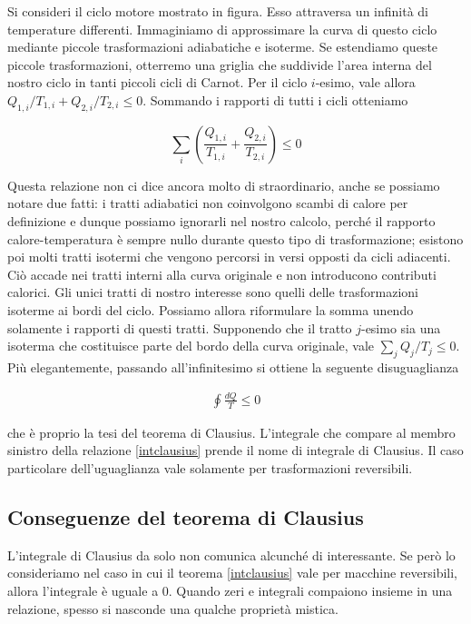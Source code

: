 Si consideri il ciclo motore mostrato in figura. Esso attraversa
un infinità di temperature differenti. Immaginiamo di approssimare
la curva di questo ciclo mediante piccole trasformazioni adiabatiche
e isoterme. Se estendiamo queste piccole trasformazioni, otterremo
una griglia che suddivide l'area interna del nostro ciclo in tanti
piccoli cicli di Carnot. Per il ciclo $i$-esimo, vale allora
$Q_{1,i}/T_{1,i} + Q_{2,i}/T_{2,i} \leq 0$. Sommando i rapporti di
tutti i cicli otteniamo

\[ \sum_i \left(\frac{Q_{1,i}}{T_{1,i}} + \frac{Q_{2,i}}{T_{2,i}}\right) \leq 0 \]

\noindent Questa relazione non ci dice ancora molto di straordinario,
anche se possiamo notare due fatti: i tratti adiabatici non coinvolgono
scambi di calore per definizione e dunque possiamo ignorarli nel
nostro calcolo, perché il rapporto calore-temperatura è sempre nullo
durante questo tipo di trasformazione; esistono poi molti tratti
isotermi che vengono percorsi in versi opposti da cicli adiacenti.
Ciò accade nei tratti interni alla curva originale e non introducono
contributi calorici. Gli unici tratti di nostro interesse sono
quelli delle trasformazioni isoterme ai bordi del ciclo. Possiamo
allora riformulare la somma unendo solamente i rapporti di questi
tratti. Supponendo che il tratto $j$-esimo sia una isoterma che
costituisce parte del bordo della curva originale, vale
$\sum_j Q_j/T_j \leq 0$. Più elegantemente, passando all'infinitesimo
si ottiene la seguente disuguaglianza

\begin{align}
    \oint \frac{dQ}{T} \leq 0\label{intclausius}
\end{align}

\noindent che è proprio la tesi del teorema di Clausius. L'integrale
che compare al membro sinistro della relazione \ref{intclausius}
prende il nome di integrale di Clausius. Il caso particolare
dell'uguaglianza vale solamente per trasformazioni reversibili.

\subsection{Conseguenze del teorema di Clausius}
L'integrale di Clausius da solo non comunica alcunché di interessante.
Se però lo consideriamo nel caso in cui il teorema \ref{intclausius}
vale per macchine reversibili, allora l'integrale è uguale a 0. Quando
zeri e integrali compaiono insieme in una relazione, spesso si
nasconde una qualche proprietà mistica.

